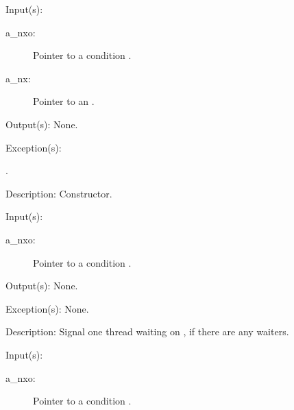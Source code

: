 \begin{capi}
\label{nxo_condition_new}
	\begin{capilist}
	\item[Input(s): ]
		\begin{description}\item[]
		\item[a\_nxo: ]
			Pointer to a condition .
		\item[a\_nx: ]
			Pointer to an .
		\end{description}
	\item[Output(s): ] None.
	\item[Exception(s): ]
		\begin{description}\item[]
		\item[.]
		\end{description}
	\item[Description: ]
		Constructor.
	\end{capilist}
\label{nxo_condition_signal}
	\begin{capilist}
	\item[Input(s): ]
		\begin{description}\item[]
		\item[a\_nxo: ]
			Pointer to a condition \classname{nxo}.
		\end{description}
	\item[Output(s): ] None.
	\item[Exception(s): ] None.
	\item[Description: ]
		Signal one thread waiting on , if there are any
		waiters.
	\end{capilist}
\label{nxo_condition_broadcast}
	\begin{capilist}
	\item[Input(s): ]
		\begin{description}\item[]
		\item[a\_nxo: ]
			Pointer to a condition .
		\end{description}

\end{capilist}
\end{capi}

